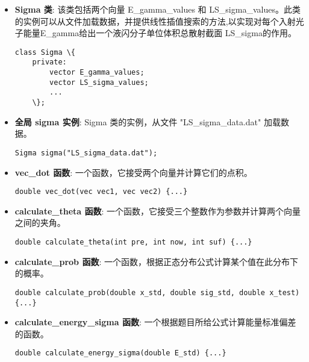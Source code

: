 \documentclass[12pt,a4paper]{article}%
\begin{document}
\begin{tcolorbox}[width=16cm]
    \begin{itemize}
    \item \textbf{Sigma 类}: 该类包括两个向量 E\_gamma\_values 和 LS\_sigma\_values。此类的实例可以从文件加载数据，并提供线性插值搜索的方法,以实现对每个入射光子能量E\_gamma给出一个液闪分子单位体积总散射截面 LS\_sigma的作用。
    \begin{lstlisting}[style=mystyle]
    class Sigma \{
    private:
        vector E_gamma_values;
        vector LS_sigma_values;
        ...
    \};
    \end{lstlisting}  
    
    \item \textbf{全局 sigma 实例}: Sigma 类的实例，从文件 "LS\_sigma\_data.dat" 加载数据。
    \begin{lstlisting}[style=mystyle]
    Sigma sigma("LS_sigma_data.dat");
    \end{lstlisting}
    
    \item \textbf{vec\_dot 函数}: 一个函数，它接受两个向量并计算它们的点积。
    \begin{lstlisting}[style=mystyle]
    double vec_dot(vec vec1, vec vec2) {...}
    \end{lstlisting}
    
    \item \textbf{calculate\_theta 函数}: 一个函数，它接受三个整数作为参数并计算两个向量之间的夹角。
    \begin{lstlisting}[style=mystyle]
    double calculate_theta(int pre, int now, int suf) {...}
    \end{lstlisting}
    
    \item \textbf{calculate\_prob 函数}: 一个函数，根据正态分布公式计算某个值在此分布下的概率。
    \begin{lstlisting}[style=mystyle]
    double calculate_prob(double x_std, double sig_std, double x_test) {...}
    \end{lstlisting}
    
    \item \textbf{calculate\_energy\_sigma 函数}: 一个根据题目所给公式计算能量标准偏差的函数。
    \begin{lstlisting}[style=mystyle]
    double calculate_energy_sigma(double E_std) {...}
    \end{lstlisting}
    \end{itemize}
\end{tcolorbox} 
\end{document}

